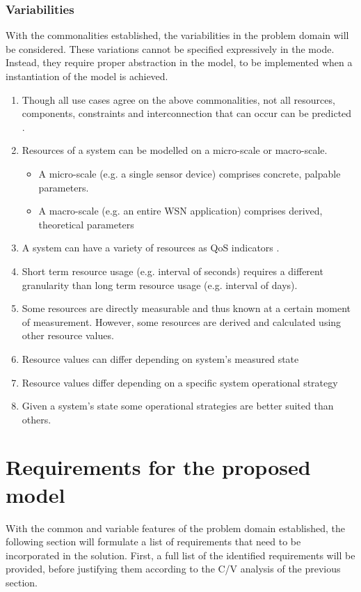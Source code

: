 \subsubsection{Variabilities}
With the commonalities established, the variabilities in the problem domain will be considered. These variations cannot be specified expressively in the mode. Instead, they require proper abstraction in the model, to be implemented when a instantiation of the model is achieved.
\begin{enumerate}[label=V\rdmid .\arabic*]
\nospace
\item \label{v:1obvious} Though all use cases agree on the above commonalities, not all resources, components, constraints and interconnection that can occur can be predicted \cite{qos_challenges}.
\item \label{v:2micro_macro} Resources of a system can be modelled on a micro-scale or macro-scale.
\begin{itemize}
\nospace
\item A micro-scale (e.g. a single sensor device) comprises concrete, palpable parameters.
\item A macro-scale (e.g. an entire WSN application) comprises derived, theoretical parameters
\end{itemize}
\item \label{v:3nr_optimizer} A system can have a variety of resources as QoS indicators \cite{qos_challenges}.
\item \label{v:4granularity} Short term resource usage (e.g. interval of seconds) requires a different granularity than long term resource usage (e.g. interval of days).
\item \label{v:5measure_vs_derive} Some resources are directly measurable and thus known at a certain moment of measurement. However, some resources are derived and calculated using other resource values.
\item \label{v:6state} Resource values can differ depending on system's measured state
\item \label{v:7function} Resource values differ depending on a specific system operational strategy
\item \label{v:8rum} Given a system's state some operational strategies are better suited than others.
\end{enumerate}

\section{Requirements for the proposed model}
With the common and variable features of the problem domain established, the following section will formulate a list of requirements that need to be incorporated in the solution. First, a full list of the identified requirements will be provided, before justifying them according to the C/V analysis of the previous section.
